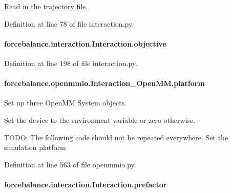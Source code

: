 Read in the trajectory file. 



Definition at line 78 of file interaction.\-py.

\hypertarget{classforcebalance_1_1interaction_1_1Interaction_ad25168cac2752545c55fc7e9206d9d29}{
\paragraph[{objective}]{\setlength{\rightskip}{0pt plus 5cm}forcebalance.\-interaction.\-Interaction.\-objective\hspace{0.3cm}{\ttfamily [inherited]}}}\label{classforcebalance_1_1interaction_1_1Interaction_ad25168cac2752545c55fc7e9206d9d29}


Definition at line 198 of file interaction.\-py.

\hypertarget{classforcebalance_1_1openmmio_1_1Interaction__OpenMM_a2cb5810aea0daabf203c7f343954c161}{
\paragraph[{platform}]{\setlength{\rightskip}{0pt plus 5cm}forcebalance.\-openmmio.\-Interaction\-\_\-\-Open\-M\-M.\-platform}}\label{classforcebalance_1_1openmmio_1_1Interaction__OpenMM_a2cb5810aea0daabf203c7f343954c161}


Set up three Open\-M\-M System objects. 

Set the device to the environment variable or zero otherwise.

T\-O\-D\-O\-: The following code should not be repeated everywhere. Set the simulation platform 

Definition at line 563 of file openmmio.\-py.

\hypertarget{classforcebalance_1_1interaction_1_1Interaction_ad4e78437713a0b9b809e4ba52cbbf9d2}{
\paragraph[{prefactor}]{\setlength{\rightskip}{0pt plus 5cm}forcebalance.\-interaction.\-Interaction.\-prefactor\hspace{0.3cm}{\ttfamily [inherited]}}}\label{classforcebalance_1_1interaction_1_1Interaction_ad4e78437713a0b9b809e4ba52cbbf9d2}


